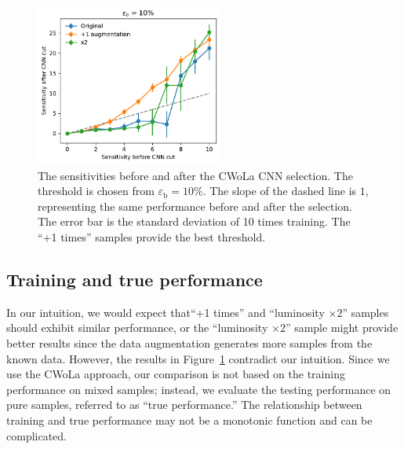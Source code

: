 \documentclass[12pt]{article}
\begin{document}
        \begin{figure}[htpb]
            \centering
            \includegraphics[width=0.55\textwidth]{HVmodel_sensitivity_improvement_bkg_eff_10.pdf}
            \caption{The sensitivities before and after the CWoLa CNN selection. The threshold is chosen from $\varepsilon_{\text{b}} = 10\%$. The slope of the dashed line is $1$, representing the same performance before and after the selection. The error bar is the standard deviation of 10 times training. The ``+1 times'' samples provide the best threshold.}
            \label{fig:sensitivity_improvement_bkg_eff_01}
        \end{figure}
    \subsection{Training and true performance}%
    \label{sub:training_and_true_performance}
        In our intuition, we would expect that``+1 times'' and ``luminosity  $\times 2$'' samples should exhibit similar performance, or the ``luminosity  $\times 2$'' sample might provide better results since the data augmentation generates more samples from the known data. However, the results in Figure~\ref{fig:sensitivity_improvement_bkg_eff_01} contradict our intuition. Since we use the CWoLa approach, our comparison is not based on the training performance on mixed samples; instead, we evaluate the testing performance on pure samples, referred to as ``true performance.'' The relationship between training and true performance may not be a monotonic function and can be complicated.
\end{document}
